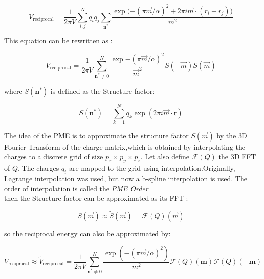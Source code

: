 \documentclass[11pt,twoside,a4paper]{report}
\begin{document}
\begin{equation*}
    V_{\text{reciprocal}} =\frac{1}{2 \pi V} \sum\limits_{i,j}^{N} q_i q_j \sum\limits_{\textbf{n}^*} \frac{\exp{(-(\pi \overrightarrow{m}/\alpha)^2} +2\pi i \overrightarrow{m} \cdot (r_i - r_j))}{m^2}    
\end{equation*}



This equation can be rewritten as :

\begin{equation*}
    V_{\text{reciprocal}} =\frac{1}{2 \pi V} \sum\limits_{\textbf{n}^* \neq 0}^{N}  \frac{\exp{-(\pi \overrightarrow{m}/\alpha)^2}}{\overrightarrow{m}^2}S(-\overrightarrow{m} )S(\overrightarrow{m} )
\end{equation*}

where $S(\textbf{n}^* )$ is defined as the Structure factor:

\begin{equation}
    S(\textbf{n}^* ) = \sum\limits_{k=1}^{N} {q_k \exp(2 \pi i \vec{m} \cdot \textbf{r}) }
\end{equation}


The idea of the PME is to approximate the structure factor $S(\vec{m})$ by the 3D Fourier Transform of the charge matrix,which is obtained by interpolating the charges to a discrete grid of size $ p_x \times p_y \times p_z $. 
	Let also define $\mathcal{F}(Q)$ the 3D FFT of $Q$. The charges $q_i$ are mapped to the grid using interpolation.Originally, Lagrange interpolation was used, but now a b-spline interpolation is used. The order of interpolation is called the \textit{PME Order}\\

then the Structure factor can be approximated as its FFT :

\begin{equation}
   S(\overrightarrow{m}) \approx \widetilde{S}(\overrightarrow{m}) = \mathcal{F}(Q)(\overrightarrow{m})
\end{equation}

so the reciprocal energy can also be approximated by:

\begin{equation}
   V_{\text{reciprocal}} \approx \widetilde{V}_{\text{reciprocal}}   =\frac{1}{2 \pi V} \sum\limits_{\textbf{n}^* \neq 0}^{N}  \frac{\exp{(-(\pi \overrightarrow{m}/\alpha)^2)}}{m^2}\mathcal{F}(Q)(\textbf{m})\mathcal{F}(Q)(-\textbf{m})
\end{equation} \\
\end{document}
